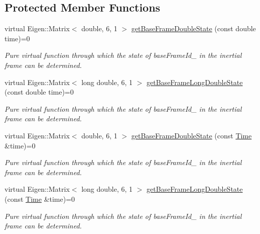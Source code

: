 \subsection*{Protected Member Functions}
\begin{DoxyCompactItemize}
\item 
virtual Eigen\+::\+Matrix$<$ double, 6, 1 $>$ \hyperlink{classtudat_1_1simulation__setup_1_1BaseStateInterface_a008eb954015cfc4b02359126b2a29604}{get\+Base\+Frame\+Double\+State} (const double time)=0
\begin{DoxyCompactList}\small\item\em Pure virtual function through which the state of base\+Frame\+Id\+\_\+ in the inertial frame can be determined. \end{DoxyCompactList}\item 
virtual Eigen\+::\+Matrix$<$ long double, 6, 1 $>$ \hyperlink{classtudat_1_1simulation__setup_1_1BaseStateInterface_a0701e50ccd7a59be8ff1ce0576dc6af0}{get\+Base\+Frame\+Long\+Double\+State} (const double time)=0
\begin{DoxyCompactList}\small\item\em Pure virtual function through which the state of base\+Frame\+Id\+\_\+ in the inertial frame can be determined. \end{DoxyCompactList}\item 
virtual Eigen\+::\+Matrix$<$ double, 6, 1 $>$ \hyperlink{classtudat_1_1simulation__setup_1_1BaseStateInterface_aacd675d056aebe9af2f5d1642f799952}{get\+Base\+Frame\+Double\+State} (const \hyperlink{classtudat_1_1Time}{Time} \&time)=0
\begin{DoxyCompactList}\small\item\em Pure virtual function through which the state of base\+Frame\+Id\+\_\+ in the inertial frame can be determined. \end{DoxyCompactList}\item 
virtual Eigen\+::\+Matrix$<$ long double, 6, 1 $>$ \hyperlink{classtudat_1_1simulation__setup_1_1BaseStateInterface_afeaa791b565e385d8a8b0c9224b1e37f}{get\+Base\+Frame\+Long\+Double\+State} (const \hyperlink{classtudat_1_1Time}{Time} \&time)=0
\begin{DoxyCompactList}\small\item\em Pure virtual function through which the state of base\+Frame\+Id\+\_\+ in the inertial frame can be determined. \end{DoxyCompactList}\end{DoxyCompactItemize}
